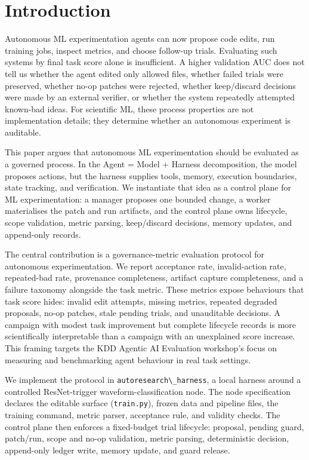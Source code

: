 \section{Introduction}\label{introduction}

Autonomous ML experimentation agents can now propose code edits, run training jobs, inspect metrics, and choose follow-up trials. Evaluating such systems by final task score alone is insufficient. A higher validation AUC does not tell us whether the agent edited only allowed files, whether failed trials were preserved, whether no-op patches were rejected, whether keep/discard decisions were made by an external verifier, or whether the system repeatedly attempted known-bad ideas. For scientific ML, these process properties are not implementation details; they determine whether an autonomous experiment is auditable.

This paper argues that autonomous ML experimentation should be evaluated as a governed process. In the Agent = Model + Harness decomposition, the model proposes actions, but the harness supplies tools, memory, execution boundaries, state tracking, and verification. We instantiate that idea as a control plane for ML experimentation: a manager proposes one bounded change, a worker materialises the patch and run artifacts, and the control plane owns lifecycle, scope validation, metric parsing, keep/discard decisions, memory updates, and append-only records.

The central contribution is a governance-metric evaluation protocol for autonomous experimentation. We report acceptance rate, invalid-action rate, repeated-bad rate, provenance completeness, artifact capture completeness, and a failure taxonomy alongside the task metric. These metrics expose behaviours that task score hides: invalid edit attempts, missing metrics, repeated degraded proposals, no-op patches, stale pending trials, and unauditable decisions. A campaign with modest task improvement but complete lifecycle records is more scientifically interpretable than a campaign with an unexplained score increase. This framing targets the KDD Agentic AI Evaluation workshop's focus on measuring and benchmarking agent behaviour in real task settings.

We implement the protocol in \passthrough{\lstinline!autoresearch\_harness!}, a local harness around a controlled ResNet-trigger waveform-classification node. The node specification declares the editable surface (\passthrough{\lstinline!train.py!}), frozen data and pipeline files, the training command, metric parser, acceptance rule, and validity checks. The control plane then enforces a fixed-budget trial lifecycle: proposal, pending guard, patch/run, scope and no-op validation, metric parsing, deterministic decision, append-only ledger write, memory update, and guard release.

